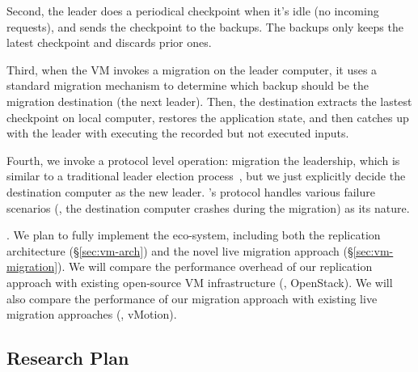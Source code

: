 Second, the leader does a periodical checkpoint when it's idle (no incoming 
requests), and sends the checkpoint to the backups. The backups only keeps 
the latest checkpoint and discards prior ones.

Third, when the VM invokes a migration on the leader computer, it uses a 
standard migration mechanism to determine which backup should be the migration 
destination (the next leader). Then, the destination extracts the lastest
checkpoint on local computer, restores the application state, and then catches 
up with the leader with executing the recorded but not executed inputs.

Fourth, we invoke a \falcon protocol level operation: migration the 
leadership, which is similar to a traditional \paxos leader election 
process~\cite{paxos:practical}, but we just explicitly decide the destination 
computer as the new leader. \falcon's protocol handles various failure 
scenarios (\eg, the destination computer crashes during the migration) as its 
\paxos nature.


. We plan to fully implement the eco-system, including both 
the replication architecture (\S\ref{sec:vm-arch}) and the novel live 
migration approach (\S\ref{sec:vm-migration}). We will compare the 
performance overhead of our replication approach with existing open-source VM 
infrastructure (\eg, OpenStack). We will also compare the performance of our 
migration approach with existing live migration approaches (\eg, vMotion).


% 

\vspace{-.15in}\subsection{Research Plan} \label{sec:plan}\vspace{-.075in}


